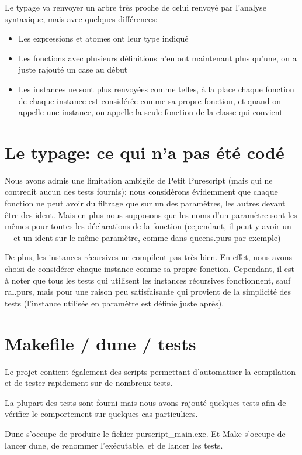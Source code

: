 \documentclass[12pt,a4paper,french]{article}
\begin{document}
Le typage va renvoyer un arbre très proche de celui renvoyé par l'analyse syntaxique, mais avec quelques différences:

\begin{itemize}
	\item Les expressions et atomes ont leur type indiqué
	\item Les fonctions avec plusieurs définitions n'en ont maintenant plus qu'une, on a juste rajouté un case au début
	\item Les instances ne sont plus renvoyées comme telles, à la place chaque fonction de chaque instance est considérée comme sa propre fonction, et quand on appelle une instance, on appelle la seule fonction de la classe qui convient
\end{itemize}


\part*{Le typage: ce qui n'a pas été codé}

Nous avons admis une limitation ambigüe de Petit Purescript (mais qui ne contredit aucun des tests fournis): nous considèrons évidemment que chaque fonction ne peut avoir du filtrage
que sur un des paramètres, les autres devant être des ident. Mais en plus nous supposons que les noms d'un paramètre sont les mêmes pour toutes les déclarations de la fonction
(cependant, il peut y avoir un \_ et un ident sur le même paramètre, comme dans queens.purs par exemple)

De plus, les instances récursives ne compilent pas très bien. En effet, nous avons choisi de considérer chaque instance comme sa propre fonction.
Cependant, il est à noter que tous les tests qui utilisent les instances récursives fonctionnent, sauf ral.purs, mais pour une raison peu satisfaisante
qui provient de la simplicité des tests (l'instance utilisée en paramètre est définie juste après).


\part*{Makefile / dune / tests}
Le projet contient également des scripts permettant d'automatiser la compilation et de tester rapidement sur de nombreux tests.

La plupart des tests sont fourni mais nous avons rajouté quelques tests afin de vérifier le comportement sur quelques cas particuliers.

Dune s'occupe de produire le fichier purscript\_main.exe. Et Make s'occupe de lancer dune, de renommer l'exécutable, et de lancer les tests.
\end{document}
